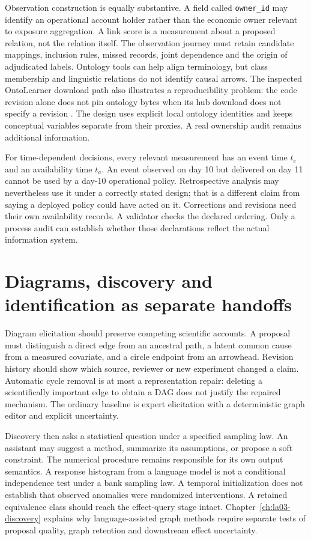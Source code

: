 Observation construction is equally substantive. A field called
\texttt{owner\_id} may identify an operational account holder rather than the
economic owner relevant to exposure aggregation. A link score is a measurement
about a proposed relation, not the relation itself. The observation journey must
retain candidate mappings, inclusion rules, missed records, joint dependence
and the origin of adjudicated labels. Ontology tools can help align terminology,
but class membership and linguistic relations do not identify causal arrows.
The inspected OntoLearner download path also illustrates a reproducibility
problem: the code revision alone does not pin ontology bytes when its hub download
does not specify a revision \cite{v12_la_package_ontolearner}. The design uses
explicit local ontology identities and keeps conceptual variables separate from
their proxies. A real ownership audit remains additional information.

For time-dependent decisions, every relevant measurement has an event time
$t_e$ and an availability time $t_a$. An event observed on day 10 but delivered
on day 11 cannot be used by a day-10 operational policy. Retrospective analysis
may nevertheless use it under a correctly stated design; that is a different
claim from saying a deployed policy could have acted on it. Corrections and
revisions need their own availability records. A validator checks the declared
ordering. Only a process audit can establish whether those declarations reflect
the actual information system.

\section{Diagrams, discovery and identification as separate handoffs}

Diagram elicitation should preserve competing scientific accounts. A proposal
must distinguish a direct edge from an ancestral path, a latent common cause
from a measured covariate, and a circle endpoint from an arrowhead. Revision
history should show which source, reviewer or new experiment changed a claim.
Automatic cycle removal is at most a representation repair: deleting a
scientifically important edge to obtain a DAG does not justify the repaired
mechanism. The ordinary baseline is expert elicitation with a deterministic
graph editor and explicit uncertainty.

Discovery then asks a statistical question under a specified sampling law.
An assistant may suggest a method, summarize its assumptions, or propose a soft
constraint. The numerical procedure remains responsible for its own output
semantics. A response histogram from a language model is not a conditional
independence test under a bank sampling law. A temporal initialization does not
establish that observed anomalies were randomized interventions. A retained
equivalence class should reach the effect-query stage intact. Chapter~\ref{ch:la03-discovery}
explains why language-assisted graph methods require separate tests of
proposal quality, graph retention and downstream effect uncertainty.

